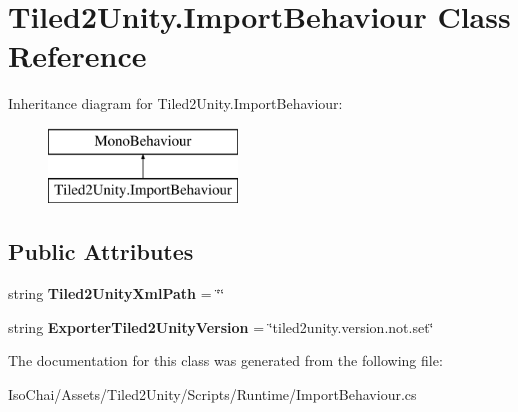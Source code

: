 \hypertarget{class_tiled2_unity_1_1_import_behaviour}{}\section{Tiled2\+Unity.\+Import\+Behaviour Class Reference}
\label{class_tiled2_unity_1_1_import_behaviour}
Inheritance diagram for Tiled2\+Unity.\+Import\+Behaviour\+:\begin{figure}[H]
\begin{center}
\leavevmode
\includegraphics[height=2.000000cm]{class_tiled2_unity_1_1_import_behaviour}
\end{center}
\end{figure}
\subsection*{Public Attributes}
\begin{DoxyCompactItemize}
\item 
\mbox{\label{class_tiled2_unity_1_1_import_behaviour_a8562ebe80cd0f8e44403ec3eb604ddfd}} 
string {\bfseries Tiled2\+Unity\+Xml\+Path} = \char`\"{}\char`\"{}
\item 
\mbox{\label{class_tiled2_unity_1_1_import_behaviour_ad8c0fb24237c9f5fa29ebb4946420805}} 
string {\bfseries Exporter\+Tiled2\+Unity\+Version} = \char`\"{}tiled2unity.\+version.\+not.\+set\char`\"{}
\end{DoxyCompactItemize}


The documentation for this class was generated from the following file\+:\begin{DoxyCompactItemize}
\item 
Iso\+Chai/\+Assets/\+Tiled2\+Unity/\+Scripts/\+Runtime/Import\+Behaviour.\+cs\end{DoxyCompactItemize}
